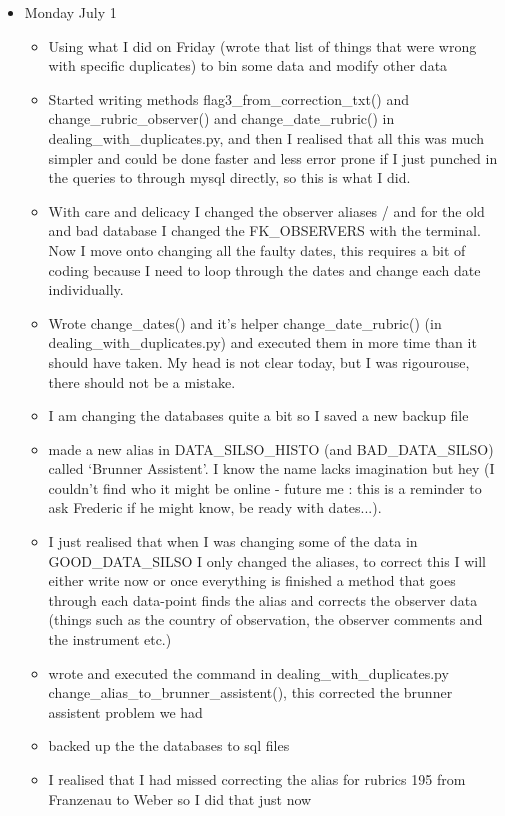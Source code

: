 \documentclass[12pt]{article}
\begin{document}
\begin{itemize}
\item Monday July 1
    \begin{itemize}
        \item Using what I did on Friday (wrote that list of things that were wrong with specific duplicates) to bin some data and modify other data
        \item Started writing methods flag3\_from\_correction\_txt() and change\_rubric\_observer() and change\_date\_rubric() in dealing\_with\_duplicates.py, and then I realised that all this was much simpler and could be done faster and less error prone if I just punched in the queries to through mysql directly, so this is what I did.
        \item With care and delicacy I changed the observer aliases / and for the old and bad database I changed the FK\_OBSERVERS with the terminal. Now I move onto changing all the faulty dates, this requires a bit of coding because I need to loop through the dates and change each date individually.
        \item Wrote change\_dates() and it's helper change\_date\_rubric() (in dealing\_with\_duplicates.py) and executed them in more time than it should have taken. My head is not clear today, but I was rigourouse, there should not be a mistake.
        \item I am changing the databases quite a bit so I saved a new backup file
        \item made a new alias in DATA\_SILSO\_HISTO (and BAD\_DATA\_SILSO) called `Brunner Assistent'. I know the name lacks imagination but hey (I couldn't find who it might be online - future me : this is a reminder to ask Frederic if he might know, be ready with dates...).
        \item I just realised that when I was changing some of the data in GOOD\_DATA\_SILSO I only changed the aliases, to correct this I will either write now or once everything is finished a method that goes through each data-point finds the alias and corrects the observer data (things such as the country of observation, the observer comments and the instrument etc.)
        \item wrote and executed the command in dealing\_with\_duplicates.py change\_alias\_to\_brunner\_assistent(), this corrected the brunner assistent problem we had
        \item backed up the the databases to sql files
        \item I realised that I had missed correcting the alias for rubrics 195 from Franzenau to Weber so I did that just now

\end{itemize}
\end{itemize}
\end{document}
